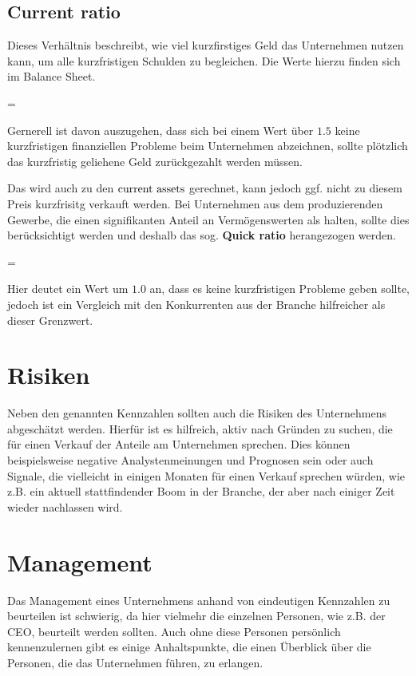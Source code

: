 %
\subsection{Current ratio}
\label{sec:current_ratio}

Dieses Verhältnis beschreibt, wie viel kurzfirstiges Geld das Unternehmen nutzen kann, um alle kurzfristigen Schulden zu begleichen.
Die Werte hierzu finden sich im Balance Sheet.
\begin{formel}
     = 
\end{formel}
Gernerell ist davon auszugehen, dass sich bei einem Wert über $1.5$ keine kurzfristigen finanziellen Probleme beim Unternehmen abzeichnen, sollte plötzlich das kurzfristig geliehene Geld zurückgezahlt werden müssen.

Das \inventories wird auch zu den $\text{current assets}$ gerechnet, kann jedoch ggf. nicht zu diesem Preis kurzfrisitg verkauft werden. 
Bei Unternehmen aus dem produzierenden Gewerbe, die einen signifikanten Anteil an Vermögenswerten als \inventories halten, sollte dies berücksichtigt werden und deshalb das sog. \textbf{Quick ratio} herangezogen werden.
\begin{formel}
     = 
\end{formel}
Hier deutet ein Wert um $1.0$ an, dass es keine kurzfristigen Probleme geben sollte, jedoch ist ein Vergleich mit den Konkurrenten aus der Branche hilfreicher als dieser Grenzwert.

%
\section{Risiken}
Neben den genannten Kennzahlen sollten auch die Risiken des Unternehmens abgeschätzt werden.
Hierfür ist es hilfreich, aktiv nach Gründen zu suchen, die für einen Verkauf der Anteile am Unternehmen sprechen.
Dies können beispielsweise negative Analystenmeinungen und Prognosen sein oder auch Signale, die vielleicht in einigen Monaten für einen Verkauf sprechen würden, wie z.B. ein aktuell stattfindender Boom in der Branche, der aber nach einiger Zeit wieder nachlassen wird.

%
\section{Management}
Das Management eines Unternehmens anhand von eindeutigen Kennzahlen zu beurteilen ist schwierig, da hier vielmehr die einzelnen Personen, wie z.B. der CEO, beurteilt werden sollten.
Auch ohne diese Personen persönlich kennenzulernen gibt es einige Anhaltspunkte, die einen Überblick über die Personen, die das Unternehmen führen, zu erlangen.

